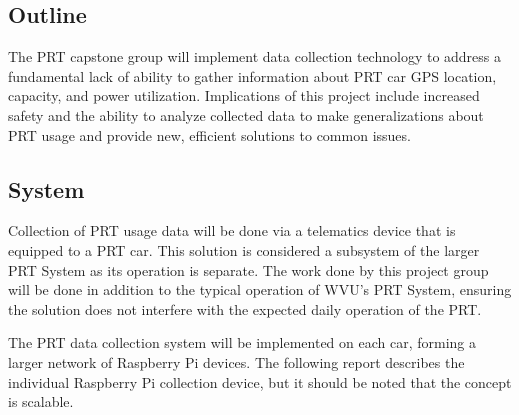 \subsection{Outline}
The PRT capstone group will implement data collection technology to address a fundamental lack of ability to gather information about PRT car GPS location, capacity, and power utilization. 
Implications of this project include increased safety and the ability to analyze collected data to make generalizations about PRT usage and provide new, efficient solutions to common issues.

\subsection{System}
Collection of PRT usage data will be done via a telematics device that is equipped to a PRT car. 
This solution is considered a subsystem of the larger PRT System as its operation is separate. 
The work done by this project group will be done in addition to the typical operation of WVU’s PRT System, ensuring the solution does not interfere with the expected daily operation of the PRT.

The PRT data collection system will be implemented on each car, forming a larger network of Raspberry Pi devices. 
The following report describes the individual Raspberry Pi collection device, but it should be noted that the concept is scalable. 